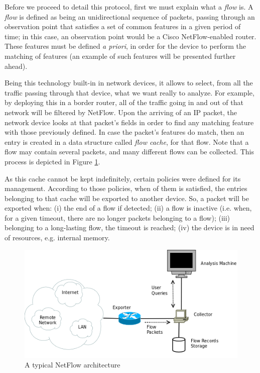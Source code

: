 \documentclass[runningheads,a4paper]{llncs}
\begin{document}
Before we proceed to detail this protocol, first we must explain what a \textit{flow} is. A \textit{flow} is defined as being an unidirectional sequence of packets, passing through an observation point that satisfies a set of common features in a given period of time;  in this case, an observation point would be a Cisco NetFlow-enabled router. These features must be defined \textit{a priori}, in order for the device to perform the matching of features (an example of such features will be presented further ahead). 

Being this technology built-in in network devices, it allows to select, from all the traffic passing through that device, what we want really to analyze. For example, by deploying this in a border router, all of the traffic going in and out of that network will be filtered by NetFlow. Upon the arriving of an IP packet, the network device looks at that packet's fields in order to find any matching feature with those previously defined. In case the packet's features do match, then an entry is created in a data structure called \textit{flow cache}, for that flow. Note that a flow may contain several packets, and many different flows can be collected. This process is depicted in Figure \ref{fig:nfarch}.

As this cache cannot be kept indefinitely, certain policies were defined for its management. According to those policies, when of them is satisfied, the entries belonging to that cache will be exported to another device. So, a packet will be exported when: (i) the end of a flow if detected; (ii) a flow is inactive (i.e. when, for a given timeout, there are no longer packets belonging to a flow); (iii) belonging to a long-lasting flow, the timeout is reached; (iv) the device is in need of resources, e.g. internal memory.   


\begin{figure}[htp]
\centering
\includegraphics[scale=0.70]{netflow_arch.png}
\caption{A typical NetFlow architecture}
\label{fig:nfarch}
\end{figure}
\end{document}
